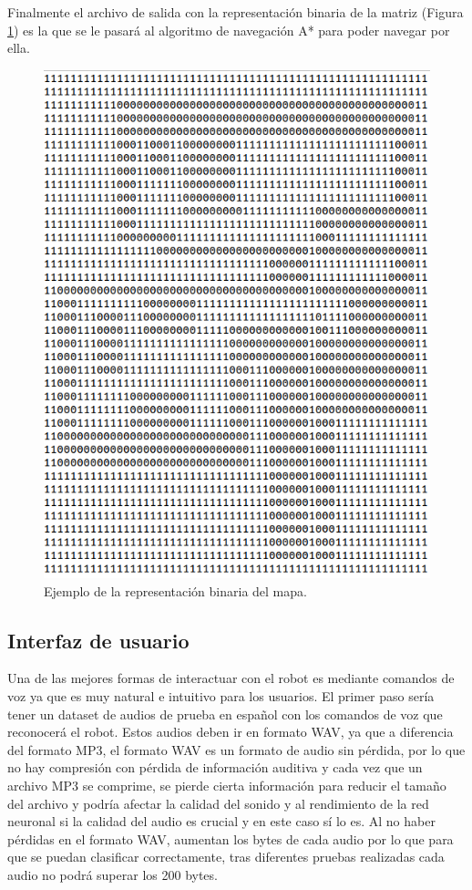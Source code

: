 Finalmente el archivo de salida con la representación binaria de la matriz (Figura \ref{fig:bin}) es la que se le pasará al algoritmo de navegación A* para poder navegar por ella. 

\begin{figure}[H]
  \centering
  \includegraphics[scale=0.5]{figs/bin} %
  \caption{ Ejemplo de la representación binaria del mapa.}
  \label{fig:bin}
\end{figure}


\subsection{Interfaz de usuario}
\label{subsec:interfaz_usuario}

Una de las mejores formas de interactuar con el robot es mediante comandos de voz ya que es muy natural e intuitivo para los usuarios. El primer paso sería tener un dataset de audios de prueba en español con los comandos de voz que reconocerá el robot. Estos audios deben ir en formato WAV, ya que a diferencia del formato MP3, el formato WAV es un formato de audio sin pérdida, por lo que no hay compresión con pérdida de información auditiva y cada vez que un archivo MP3 se comprime, se pierde cierta información para reducir el tamaño del archivo y podría afectar la calidad del sonido y al rendimiento de la red neuronal si la calidad del audio es crucial y en este caso sí lo es. Al no haber pérdidas en el formato WAV, aumentan los bytes de cada audio por lo que para que se puedan clasificar correctamente, tras diferentes pruebas realizadas cada audio no podrá superar los 200 bytes.\\


